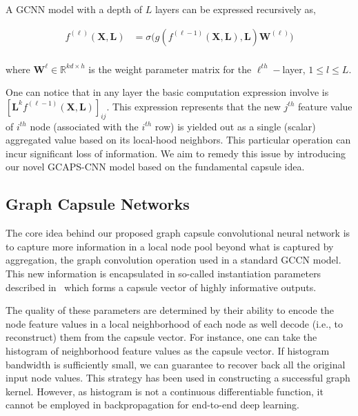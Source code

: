 \documentclass{article}
\begin{document}
A GCNN model with  a depth of $L$  layers can  be  expressed recursively as, 

\begin{equation}\label{eq:layer_gcnn}
\begin{split}
f^{(\ell)}(\mathbf{X}, \mathbf{L}) & = \sigma \big( g(f^{(\ell-1)}(\mathbf{X}, \mathbf{L}), \mathbf{L}) \mathbf{W}^{(\ell)}\big) \\
\end{split}
\end{equation}

where $\mathbf{W}^{\ell} \in \mathbb{R}^{kd \times h}$ is the  weight parameter matrix for the $\ell^{th}-$layer, $1 \leq l \leq L$.

One can notice that in any layer the basic computation expression involve is $[\mathbf{L}^{k}f^{(\ell-1)}(\mathbf{X}, \mathbf{L})]_{ij}$. This expression represents that the new $j^{th}$ feature value of  $i^{th}$ node  (associated   with the $i^{th}$ row)  is yielded out as a single (scalar) aggregated value based on its local-hood neighbors. This particular operation can   incur significant loss of information. We aim to remedy this issue by introducing our novel GCAPS-CNN model based on   the fundamental capsule idea.



\subsection{Graph Capsule Networks}\label{sec:graph_capsule}


The core idea behind our proposed graph capsule convolutional neural network is to   capture more information in a local node pool  beyond what is captured by aggregation, the graph convolution operation used in a standard GCCN model. This new information is encapsulated in so-called  instantiation parameters described in~\cite{hinton2011transforming} which forms a capsule vector of highly informative outputs. 

The quality of these  parameters are determined by their ability to encode the node feature values in a local neighborhood of each node  as well decode (i.e., to reconstruct) them from the capsule vector. For instance, one can take the histogram of neighborhood feature values as the  capsule vector. If histogram bandwidth is sufficiently small, we can guarantee to recover back  all the original input node   values. This strategy has been used  in constructing a successful graph kernel. However, as histogram is not a continuous differentiable function, it cannot be employed in backpropagation for  end-to-end deep learning.
\end{document}
